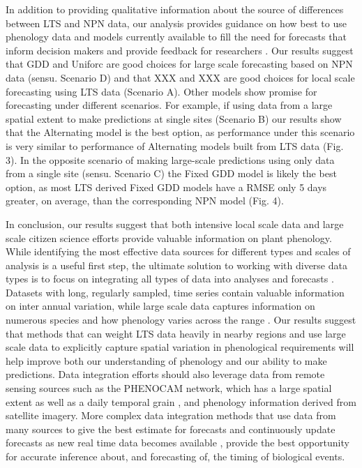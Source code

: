 \documentclass[fleqn,10pt,lineno]{wlpeerj} %
\begin{document}
In addition to providing qualitative information about the source of differences between LTS and NPN data, our analysis provides guidance on how best to use phenology data and models currently available to fill the need for forecasts that inform decision makers and provide feedback for researchers \citep{clark2001, dietze2018}. Our results suggest that GDD and Uniforc are good choices for large scale forecasting based on NPN data (sensu. Scenario D) and that XXX and XXX are good choices for local scale forecasting using LTS data (Scenario A). Other models show promise for forecasting under different scenarios. For example, if using data from a large spatial extent to make predictions at single sites (Scenario B) our results show that the Alternating model is the best option, as performance under this scenario is very similar to performance of Alternating models built from LTS data (Fig. 3). In the opposite scenario of making large-scale predictions using only data from a single site (sensu. Scenario C) the Fixed GDD model is likely the best option, as most LTS derived Fixed GDD models have a RMSE only 5 days greater, on average, than the corresponding NPN model (Fig. 4). 

In conclusion, our results suggest that both intensive local scale data and large scale citizen science efforts provide valuable information on plant phenology. While identifying the most effective data sources for different types and scales of analysis is a useful first step, the ultimate solution to working with diverse data types is to focus on integrating all types of data into analyses and forecasts \citep{hanks2018}. Datasets with long, regularly sampled, time series contain valuable information on inter annual variation, while large scale data captures information on numerous species and how phenology varies across the range  \citep{xu2013, olsson2014, basler2016, zhang2017}. Our results suggest that methods that can weight LTS data heavily in nearby regions and use large scale data to explicitly capture spatial variation in phenological requirements will help improve both our understanding of phenology and our ability to make predictions. Data integration efforts should also leverage data from remote sensing sources such as the PHENOCAM network, which has a large spatial extent as well as a daily temporal grain \citep{richardson2018}, and phenology information derived from satellite imagery. More complex data integration methods that use data from many sources to give the best estimate for forecasts \citep{ogle2015} and continuously update forecasts as new real time data becomes available \citep{luo2011, dietze2018}, provide the best opportunity for accurate inference about, and forecasting of, the timing of biological events.
\end{document}
